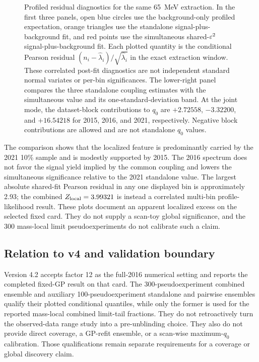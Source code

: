 \begin{figure}[H]
\centering
{}
\caption{Profiled residual diagnostics for the same 65~MeV extraction. In the
first three panels, open blue circles use the background-only profiled
expectation, orange triangles use the standalone signal-plus-background fit,
and red points use the simultaneous shared-$\varepsilon^2$ signal-plus-background fit.
Each plotted quantity is the conditional Pearson residual
$(n_i-\widehat{\lambda}_i)/\sqrt{\widehat{\lambda}_i}$ in the exact extraction
window. These correlated post-fit diagnostics are not independent standard
normal variates or per-bin significances. The lower-right panel compares the
three standalone coupling estimates with the simultaneous value and its
one-standard-deviation band. At the joint mode, the dataset-block contributions
to $q_0$ are $+2.72558$, $-3.32200$, and $+16.54218$ for 2015, 2016, and 2021,
respectively. Negative block contributions are allowed and are not standalone
$q_0$ values.}
\label{fig:results-v4p2-m065-residuals}
\end{figure}

The comparison shows that the localized feature is predominantly carried by the
2021 10\% sample and is modestly supported by 2015. The 2016 spectrum does not
favor the signal yield implied by the common coupling and lowers the
simultaneous significance relative to the 2021 standalone value. The largest
absolute shared-fit Pearson residual in any one displayed bin is approximately
2.93; the combined $Z_{\mathrm{local}}=3.99321$ is instead a
correlated multi-bin profile-likelihood result. These plots document an
apparent localized excess on the selected fixed card. They do not supply a
scan-toy global significance, and the 300 mass-local limit pseudoexperiments do
not calibrate such a claim.

\subsection{Relation to v4 and validation boundary}
\label{sec:results-v4p2-v4-context}

Version 4.2 accepts factor 12 as the full-2016 numerical setting and reports the
completed fixed-GP result on that card. The 300-pseudoexperiment combined
ensemble and auxiliary 100-pseudoexperiment standalone and pairwise ensembles
qualify their plotted conditional quantiles, while only the former is used for
the reported mass-local combined limit-tail fractions. They do not
retroactively turn the observed-data range study into a pre-unblinding choice.
They also do not provide direct \CLs{} coverage, a GP-refit ensemble, or a
scan-wise maximum-$q_0$ calibration. Those qualifications remain separate
requirements for a coverage or global discovery claim.
